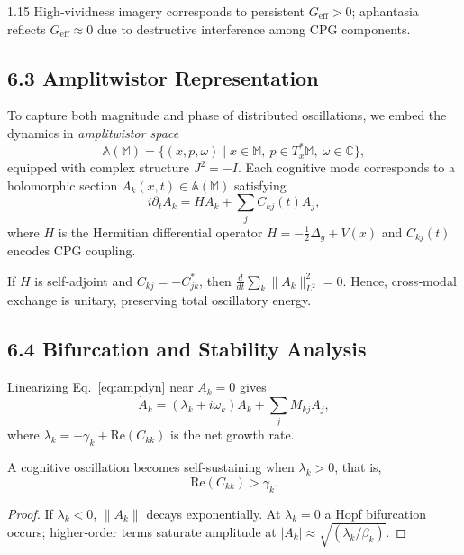 \documentclass[12pt,a4paper]{article}
\begin{document}
\begin{spacing}{1.15}
High‐vividness imagery corresponds to persistent $G_{\mathrm{eff}}\!>\!0$;  
aphantasia reflects $G_{\mathrm{eff}}\!\approx\!0$ due to destructive interference among CPG components.

\subsection{6.3 Amplitwistor Representation}

To capture both magnitude and phase of distributed oscillations, we embed the dynamics in \emph{amplitwistor space}
\[
\mathbb{A}(\mathbb{M})
 = \{(x,p,\omega)\mid x\!\in\!\mathbb{M},\ p\!\in\!T_x^\ast\mathbb{M},\ \omega\!\in\!\mathbb{C}\},
\]
equipped with complex structure $J^2=-I$.  Each cognitive mode corresponds to a holomorphic section
$A_k(x,t)\!\in\!\mathbb{A}(\mathbb{M})$ satisfying
\begin{equation}
i\partial_t A_k = H A_k + \sum_j C_{kj}(t)A_j,
\label{eq:ampdyn}
\end{equation}
where $H$ is the Hermitian differential operator
$H=-\tfrac{1}{2}\Delta_g + V(x)$ and $C_{kj}(t)$ encodes CPG coupling.

\begin{lemma}
If $H$ is self‐adjoint and $C_{kj}=-C_{jk}^\ast$, then
$\frac{d}{dt}\sum_k\|A_k\|_{L^2}^2=0$.  
Hence, cross‐modal exchange is unitary, preserving total oscillatory energy.
\end{lemma}

\subsection{6.4 Bifurcation and Stability Analysis}

Linearizing Eq.~\eqref{eq:ampdyn} near $A_k\!=\!0$ gives
\[
\dot A_k = (\lambda_k + i\omega_k)A_k + \sum_j M_{kj}A_j,
\]
where $\lambda_k=-\gamma_k+\mathrm{Re}(C_{kk})$ is the net growth rate.

\begin{theorem}
A cognitive oscillation becomes self‐sustaining when $\lambda_k\!>\!0$,  
that is,
\begin{equation}
\mathrm{Re}(C_{kk})>\gamma_k.
\label{eq:bifcrit}
\end{equation}
\end{theorem}

\begin{proof}
If $\lambda_k<0$, $\|A_k\|$ decays exponentially.  At $\lambda_k\!=\!0$ a Hopf bifurcation occurs; higher‐order terms saturate amplitude at $|A_k|\!\approx\!\sqrt{(\lambda_k/\beta_k)}$.
\end{proof}


\end{spacing}
\end{document}
